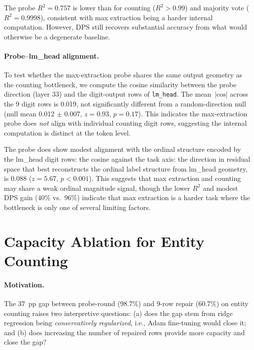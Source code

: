 \documentclass{article}
\begin{document}
The probe $R^2 = 0.757$ is lower than for counting ($R^2 > 0.99$) and majority vote
($R^2 = 0.9998$), consistent with max extraction being a harder internal computation.
However, DPS still recovers substantial accuracy from what would otherwise be a
degenerate baseline.

\paragraph{Probe--lm\_head alignment.}
To test whether the max-extraction probe shares the same output geometry as the
counting bottleneck, we compute the cosine similarity between the probe direction
(layer 33) and the digit-output rows of \texttt{lm\_head}.
The mean~$|\text{cos}|$ across the 9 digit rows is 0.019, not significantly different
from a random-direction null (null mean 0.012 $\pm$ 0.007, $z = 0.93$, $p = 0.17$).
This indicates the max-extraction probe does \emph{not} align with individual counting
digit rows, suggesting the internal computation is distinct at the token level.

The probe does show modest alignment with the ordinal structure encoded by
the lm\_head digit rows: the cosine against the task axis: the direction in residual
space that best reconstructs the ordinal label structure from lm\_head geometry, is
$0.088$ ($z = 5.67$, $p < 0.001$).
This suggests that max extraction and counting may share a weak ordinal
magnitude signal, though the lower $R^2$ and modest DPS gain (40\% vs.\ 96\%)
indicate that max extraction is a harder task where the bottleneck is only
one of several limiting factors.

\section{Capacity Ablation for Entity Counting}
\label{sec:capacity_ablation}

\paragraph{Motivation.}
The 37~pp gap between probe-round (98.7\%) and 9-row repair (60.7\%) on entity counting
raises two interpretive questions: (a) does the gap stem from ridge regression being
\emph{conservatively regularized}, i.e., Adam fine-tuning would close it; and
(b) does increasing the number of repaired rows provide more capacity and close the gap?
\end{document}
